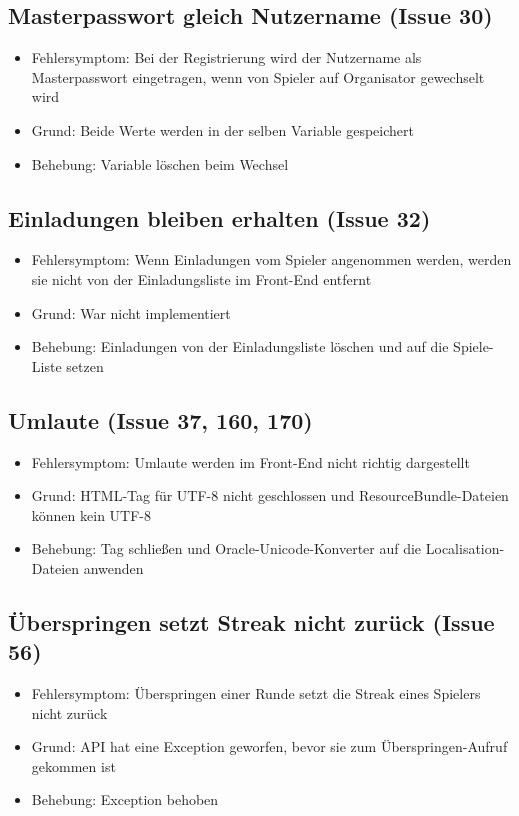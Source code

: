 \documentclass[a4paper]{scrreprt}
\begin{document}
    \subsection{Masterpasswort gleich Nutzername (Issue 30)}
    \begin{itemize}
        \item Fehlersymptom: Bei der Registrierung wird der Nutzername als Masterpasswort eingetragen, wenn von Spieler auf Organisator gewechselt wird
        \item Grund: Beide Werte werden in der selben Variable gespeichert
        \item Behebung: Variable löschen beim Wechsel
    \end{itemize}

    \subsection{Einladungen bleiben erhalten (Issue 32)}
    \begin{itemize}
        \item Fehlersymptom: Wenn Einladungen vom Spieler angenommen werden, werden sie nicht von der Einladungsliste im Front-End entfernt
        \item Grund: War nicht implementiert
        \item Behebung: Einladungen von der Einladungsliste löschen und auf die Spiele-Liste setzen
    \end{itemize}

    \subsection{Umlaute (Issue 37, 160, 170)}
    \begin{itemize}
        \item Fehlersymptom: Umlaute werden im Front-End nicht richtig dargestellt
        \item Grund: HTML-Tag für UTF-8 nicht geschlossen und ResourceBundle-Dateien können kein UTF-8
        \item Behebung: Tag schließen und Oracle-Unicode-Konverter auf die Localisation-Dateien anwenden
    \end{itemize}

    \subsection{Überspringen setzt Streak nicht zurück (Issue 56)}
    \begin{itemize}
        \item Fehlersymptom: Überspringen einer Runde setzt die Streak eines Spielers nicht zurück
        \item Grund: API hat eine Exception geworfen, bevor sie zum Überspringen-Aufruf gekommen ist
        \item Behebung: Exception behoben
    \end{itemize}
\end{document}
